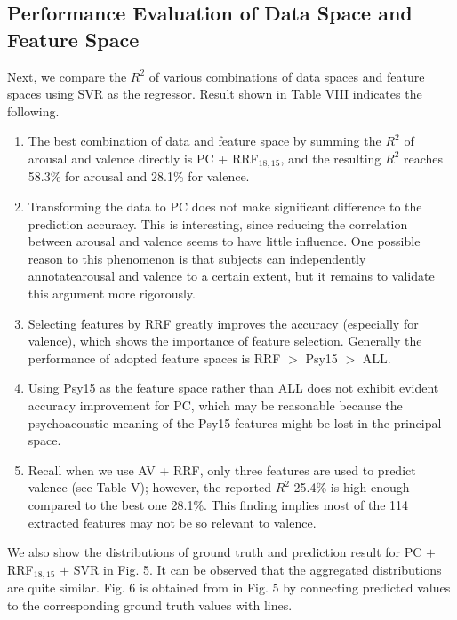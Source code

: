 \documentclass[journal, twoside]{IEEEtran}
\begin{document}
\subsection{Performance Evaluation of Data Space and Feature Space}
Next, we compare the $R^2$ of various combinations of data
spaces and feature spaces using SVR as the regressor. Result
shown in Table VIII indicates the following.
\begin{enumerate}
    \item The best combination of data and feature space by summing the $R^2$ of arousal and valence directly is PC + RRF$_{18,15}$, and the resulting $R^2$ reaches 58.3\% for arousal and 28.1\% for valence.

    \item Transforming the data to PC does not make significant difference to the prediction accuracy. This is interesting, since reducing the correlation between arousal and valence seems to have little influence. One possible reason to this phenomenon is that subjects can independently annotatearousal and valence to a certain extent, but it remains to validate this argument more rigorously.
    
    \item Selecting features by RRF greatly improves the accuracy (especially for valence), which shows the importance of feature selection. Generally the performance of adopted feature spaces is RRF $>$ Psy15 $>$ ALL.
    
    \item Using Psy15 as the feature space rather than ALL does not exhibit evident accuracy improvement for PC, which may be reasonable because the psychoacoustic meaning of the Psy15 features might be lost in the principal space.
    
    \item  Recall when we use AV + RRF, only three features are used to predict valence (see Table V); however, the reported $R^2$ 25.4\% is high enough compared to the best one 28.1\%. This finding implies most of the 114 extracted features may not be so relevant to valence.
\end{enumerate}

We also show the distributions of ground truth and prediction result for PC $+$ RRF$_{18,15}$ $+$ SVR in Fig. 5. It can be observed that the aggregated distributions are quite similar. Fig. 6 is obtained from in Fig. 5 by connecting predicted values to the corresponding ground truth values with lines.
\end{document}
